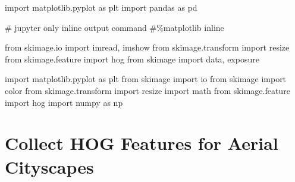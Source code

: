 \documentclass[
  letterpaper,
  DIV=11,
  numbers=noendperiod]{scrreprt}
\newenvironment{Shaded}{\begin{snugshade}}{\end{snugshade}}
\newcommand{\CommentTok}[1]{\textcolor[rgb]{0.37,0.37,0.37}{#1}}
\newcommand{\ImportTok}[1]{\textcolor[rgb]{0.00,0.46,0.62}{#1}}
\newcommand{\NormalTok}[1]{\textcolor[rgb]{0.00,0.23,0.31}{#1}}
\begin{document}
\begin{Shaded}
\begin{Highlighting}[]

\ImportTok{import}\NormalTok{ matplotlib.pyplot }\ImportTok{as}\NormalTok{ plt}
\ImportTok{import}\NormalTok{ pandas }\ImportTok{as}\NormalTok{ pd}

\CommentTok{\# jupyter only inline output command}
\CommentTok{\#\%matplotlib inline}

\ImportTok{from}\NormalTok{ skimage.io }\ImportTok{import}\NormalTok{ imread, imshow}
\ImportTok{from}\NormalTok{ skimage.transform }\ImportTok{import}\NormalTok{ resize}
\ImportTok{from}\NormalTok{ skimage.feature }\ImportTok{import}\NormalTok{ hog}
\ImportTok{from}\NormalTok{ skimage }\ImportTok{import}\NormalTok{ data, exposure}


\ImportTok{import}\NormalTok{ matplotlib.pyplot }\ImportTok{as}\NormalTok{ plt}
\ImportTok{from}\NormalTok{ skimage }\ImportTok{import}\NormalTok{ io}
\ImportTok{from}\NormalTok{ skimage }\ImportTok{import}\NormalTok{ color}
\ImportTok{from}\NormalTok{ skimage.transform }\ImportTok{import}\NormalTok{ resize}
\ImportTok{import}\NormalTok{ math}
\ImportTok{from}\NormalTok{ skimage.feature }\ImportTok{import}\NormalTok{ hog}
\ImportTok{import}\NormalTok{ numpy }\ImportTok{as}\NormalTok{ np}
\end{Highlighting}
\end{Shaded}

\section{Collect HOG Features for Aerial
Cityscapes}\label{collect-hog-features-for-aerial-cityscapes}
\end{document}

